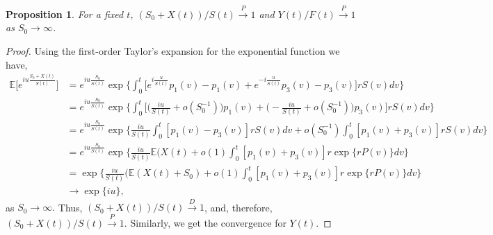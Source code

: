\documentclass[10pt]{article}
\newtheorem{proposition}{Proposition}
\newcommand{\EE}{\mathbb{E}}
\begin{document}
\begin{proposition}
For a fixed $t$, $(S_0+X(t))/S(t)  \overset{P}{\rightarrow} 1$ and $Y(t)/F(t) \overset{P}{\rightarrow} 1$ as $S_0 \rightarrow \infty$.
\end{proposition}
\begin{proof}
Using the first-order Taylor's expansion for the exponential function we have,
\begin{equation*}
\begin{split}
\EE\Big[e^{iu \frac{S_0+X(t)}{S(t)}}\Big] & =e^{iu \frac{S_0}{S(t)}} \exp \Big\{  \int_0^t \Big[ e^{i \frac{u}{S(t)}}p_1(v) - p_1(v) + e^{-i \frac{u}{S(t)}}p_3(v) - p_3(v)\Big] r S(v) dv\Big\} \\
& = e^{iu \frac{S_0}{S(t)}}\exp \Big\{ \int_0^t \Big[ \Big(\frac{iu}{S(t)}  + o\left(S_0^{-1}\right) \Big) p_1(v) + \Big( - \frac{iu}{S(t)}  + o\left(S_0^{-1}\right) \Big) p_3(v)  \Big] r S(v) dv\Big\} \\
& = e^{iu \frac{S_0}{S(t)}}\exp \Big\{ \frac{iu}{S(t)} \int_0^t  [p_1(v) - p_3(v)] r S(v) dv  +  o (S_0^{-1})\int_0^t [p_1(v) + p_3(v)] r S(v) dv \Big\} \\
& = e^{iu \frac{S_0}{S(t)}}\exp \Big\{ \frac{iu}{S(t)} \EE(X(t)  +  o (1)\int_0^t [p_1(v) + p_3(v)] r \exp\{r P(v)\} dv \Big\} \\
& = \exp \Big\{ \frac{iu}{S(t)} (\EE(X(t)+S_0)  +  o (1)\int_0^t [p_1(v) + p_3(v)] r \exp\{r P(v)\} dv \Big\} \\
& \rightarrow \exp \Big\{iu\Big\},
\end{split}
\end{equation*}
as $S_0\to\infty.$
Thus, $(S_0+X(t))/S(t)  \overset{D}{\rightarrow} 1$, and, therefore, $(S_0+X(t))/S(t)  \overset{P}{\rightarrow} 1$. Similarly, we get the convergence for $Y(t)$.

\end{proof}
\end{document}
